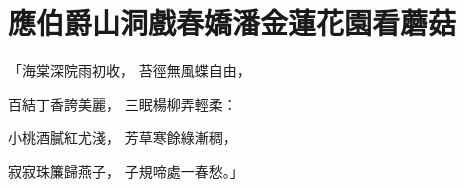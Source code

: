 %

\chapter{應伯爵山洞戲春嬌\KG 潘金蓮花園看蘑菇}


\begin{showcontents}{}




「海棠深院雨初收，  苔徑無風蝶自由，

百結丁香誇美麗，  三眠楊柳弄輕柔：

小桃酒膩紅尤淺，  芳草寒餘綠漸稠，

寂寂珠簾歸燕子，  子規啼處一春愁。」


\end{showcontents}
